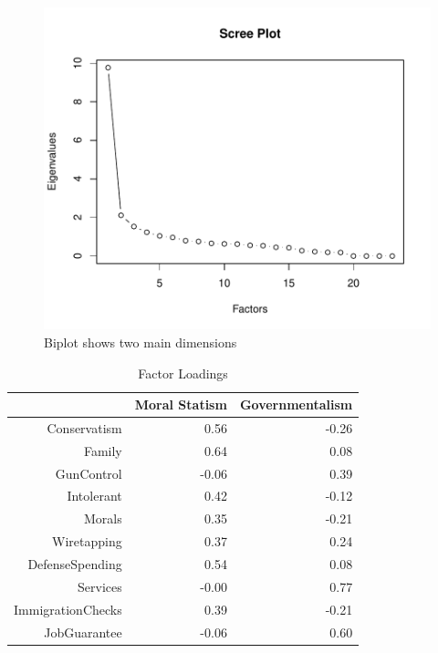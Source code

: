 \documentclass[12pt,]{article}
\begin{document}
\begin{figure}[htbp]
\centering
\includegraphics{figures/scree-1.pdf}
\caption{Biplot shows two main dimensions}
\end{figure}

\clearpage

\begin{table}[ht]
\centering
\begin{tabular}{rrr}
  \hline
 & Moral Statism & Governmentalism \\ 
  \hline
Conservatism & 0.56 & -0.26 \\ 
  Family & 0.64 & 0.08 \\ 
  GunControl & -0.06 & 0.39 \\ 
  Intolerant & 0.42 & -0.12 \\ 
  Morals & 0.35 & -0.21 \\ 
  Wiretapping & 0.37 & 0.24 \\ 
  DefenseSpending & 0.54 & 0.08 \\ 
  Services & -0.00 & 0.77 \\ 
  ImmigrationChecks & 0.39 & -0.21 \\ 
  JobGuarantee & -0.06 & 0.60 \\ 
   \hline
\end{tabular}
\caption{Factor Loadings} 
\label{Factor Loadings}
\end{table}

\clearpage
\end{document}
